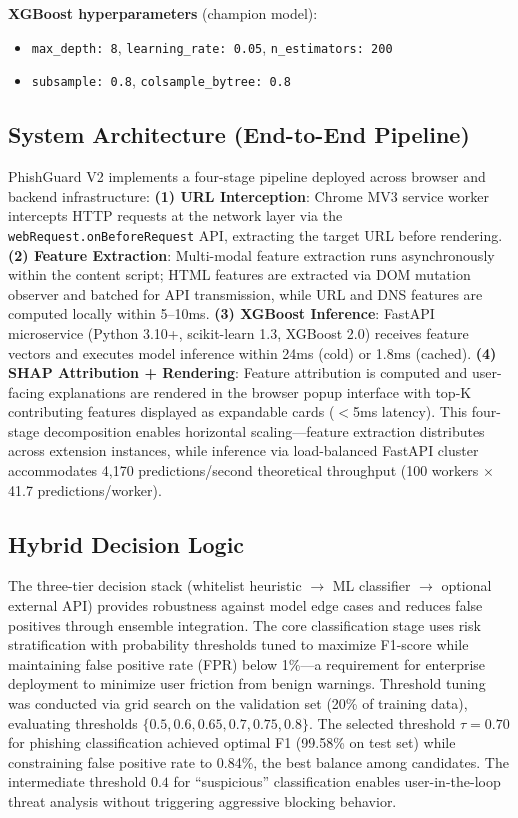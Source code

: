 \documentclass[conference]{IEEEtran}
\begin{document}
\textbf{XGBoost hyperparameters} (champion model):
\begin{itemize}
\item \texttt{max\_depth: 8}, \texttt{learning\_rate: 0.05}, \texttt{n\_estimators: 200}
\item \texttt{subsample: 0.8}, \texttt{colsample\_bytree: 0.8}
\end{itemize}

\subsection{System Architecture (End-to-End Pipeline)}

PhishGuard V2 implements a four-stage pipeline deployed across browser and backend infrastructure: \textbf{(1) URL Interception}: Chrome MV3 service worker intercepts HTTP requests at the network layer via the \texttt{webRequest.onBeforeRequest} API, extracting the target URL before rendering. \textbf{(2) Feature Extraction}: Multi-modal feature extraction runs asynchronously within the content script; HTML features are extracted via DOM mutation observer and batched for API transmission, while URL and DNS features are computed locally within 5–10ms. \textbf{(3) XGBoost Inference}: FastAPI microservice (Python 3.10+, scikit-learn 1.3, XGBoost 2.0) receives feature vectors and executes model inference within 24ms (cold) or 1.8ms (cached). \textbf{(4) SHAP Attribution + Rendering}: Feature attribution is computed and user-facing explanations are rendered in the browser popup interface with top-K contributing features displayed as expandable cards ($<$5ms latency). This four-stage decomposition enables horizontal scaling—feature extraction distributes across extension instances, while inference via load-balanced FastAPI cluster accommodates 4,170 predictions/second theoretical throughput (100 workers $\times$ 41.7 predictions/worker).

\subsection{Hybrid Decision Logic}

The three-tier decision stack (whitelist heuristic $\to$ ML classifier $\to$ optional external API) provides robustness against model edge cases and reduces false positives through ensemble integration. The core classification stage uses risk stratification with probability thresholds tuned to maximize F1-score while maintaining false positive rate (FPR) below 1\%—a requirement for enterprise deployment to minimize user friction from benign warnings. Threshold tuning was conducted via grid search on the validation set (20\% of training data), evaluating thresholds $\{0.5, 0.6, 0.65, 0.7, 0.75, 0.8\}$. The selected threshold $\tau = 0.70$ for phishing classification achieved optimal F1 (99.58\% on test set) while constraining false positive rate to 0.84\%, the best balance among candidates. The intermediate threshold $0.4$ for ``suspicious'' classification enables user-in-the-loop threat analysis without triggering aggressive blocking behavior.
\end{document}
